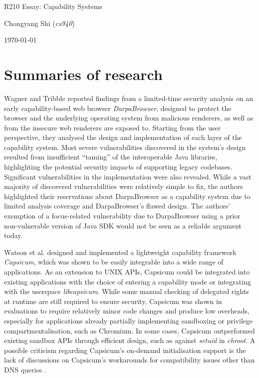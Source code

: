 \documentclass[11pt]{article}
\begin{document}
\centerline{\Large R210 Essay:  Capability Systems}
\vspace{2em}
\centerline{\large Chongyang Shi (\emph{cs940})}
\vspace{1em}
\centerline{\large \today}
\vspace{1em}

\section{Summaries of research}

Wagner and Tribble \cite{wagner2002security} reported findings from a limited-time security analysis on an early capability-based web browser \emph{DarpaBrowser}, designed to protect the browser and the underlying operating system from malicious renderers, as well as from the insecure web renderers are exposed to. Starting from the user perspective, they analysed the design and implementation of each layer of the capability system. Most severe vulnerabilities discovered in the system's design resulted from insufficient ``taming'' of the interoperable Java libraries, highlighting the potential security impacts of supporting legacy codebases. Significant vulnerabilities in the implementation were also revealed. While a vast majority of discovered vulnerabilities were relatively simple to fix, the authors highlighted their reservations about DarpaBrowser as a capability system due to limited analysis coverage and DarpaBrowser's flawed design. The authors' exemption of a focus-related vulnerability due to DarpaBrowser using a prior non-vulnerable version of Java SDK would not be seen as a reliable argument today.

Watson et al. \cite{watson2010capsicum} designed and implemented a lightweight capability framework \emph{Capsicum}, which was shown to be easily integrable into a wide range of applications. As an extension to UNIX APIs, Capsicum could be integrated into existing applications with the choice of entering a capability mode or integrating with the userspace \emph{libcapsicum}. While some manual checking of delegated rights at runtime are still required to ensure security, Capsicum was shown in evaluations to require relatively minor code changes and produce low overheads, especially for applications already partially implementing sandboxing or privilege compartmentalisation, such as Chromium. In some cases, Capsicum outperformed existing sandbox APIs through efficient design, such as against \emph{setuid} in \emph{chroot}. A possible criticism regarding Capsicum's on-demand initialisation support is the lack of discussions on Capsicum's workarounds for compatibility issues other than DNS queries \cite[4.1]{watson2010capsicum}.
\end{document}
